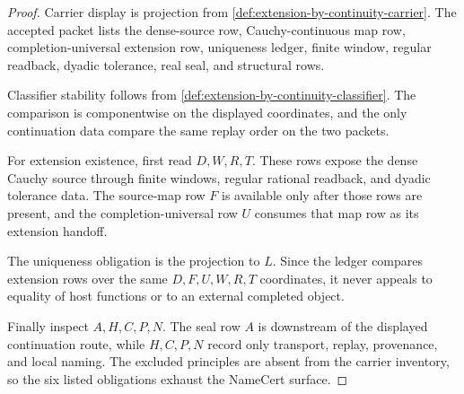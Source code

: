 \begin{proof}
Carrier display is projection from \autoref{def:extension-by-continuity-carrier}. The accepted packet lists the dense-source row, Cauchy-continuous map row, completion-universal extension row, uniqueness ledger, finite window, regular readback, dyadic tolerance, real seal, and structural rows.

Classifier stability follows from \autoref{def:extension-by-continuity-classifier}. The comparison is componentwise on the displayed coordinates, and the only continuation data compare the same replay order on the two packets.

For extension existence, first read $D,W,R,T$. These rows expose the dense Cauchy source through finite windows, regular rational readback, and dyadic tolerance data. The source-map row $F$ is available only after those rows are present, and the completion-universal row $U$ consumes that map row as its extension handoff.

The uniqueness obligation is the projection to $L$. Since the ledger compares extension rows over the same $D,F,U,W,R,T$ coordinates, it never appeals to equality of host functions or to an external completed object.

Finally inspect $A,H,C,P,N$. The seal row $A$ is downstream of the displayed continuation route, while $H,C,P,N$ record only transport, replay, provenance, and local naming. The excluded principles are absent from the carrier inventory, so the six listed obligations exhaust the NameCert surface.
\end{proof}

